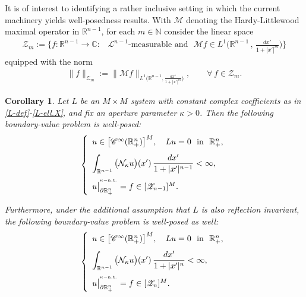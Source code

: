 \documentclass[11pt,reqno]{amsart}
\numberwithin{equation}{section}
\newtheorem{corollary}[theorem]{Corollary}
\theoremstyle{remark}
\begin{document}
It is of interest to identifying a rather inclusive setting in which the current machinery yields well-posedness results. 
With ${\mathcal{M}}$ denoting the Hardy-Littlewood maximal operator in ${\mathbb{R}}^{n-1}$, for each $m\in{\mathbb{N}}$ 
consider the linear space 
%
\begin{align}\label{76tFfaf-7GF}
{\mathscr{Z}}_m:=\Big\{f:{\mathbb{R}}^{n-1}\to{\mathbb{C}}:\,\text{ ${\mathscr{L}}^{n-1}$-measurable and }\,\,
{\mathcal{M}}f\in L^1\big({\mathbb{R}}^{n-1}\,,\,\tfrac{dx'}{1+|x'|^{m}}\big)\Big\}
\end{align}
%
equipped with the norm 
%
\begin{align}\label{76tFfaf-7GF.2}
\|f\|_{{\mathscr{Z}_m}}:=\|{\mathcal{M}}f\|_{L^1\big({\mathbb{R}}^{n-1},\frac{dx'}{1+|x'|^{m}}\big)},
\qquad\forall\,f\in{\mathscr{Z}}_m.
\end{align}

\begin{corollary}\label{Them-Gen}
Let $L$ be an $M\times M$ system with constant complex coefficients as in \eqref{L-def}-\eqref{L-ell.X}, 
and fix an aperture parameter $\kappa>0$. Then the following boundary-value problem is well-posed:
%
\begin{equation}\label{jk-lm-jhR-LLL-HM-RN.w.BVP}
\left\{
\begin{array}{l}
u\in\big[{\mathscr{C}}^{\infty}({\mathbb{R}}^n_{+})\big]^M,
\quad Lu=0\,\,\text{ in }\,\,{\mathbb{R}}^n_{+},
\\[8pt]
\displaystyle
\int_{\mathbb{R}^{n-1}}\big({\mathcal{N}}_{\kappa}u\big)(x')\,\frac{dx'}{1+|x'|^{n-1}}<\infty,
\\[12pt]
u\big|^{{}^{\kappa-{\rm n.t.}}}_{\partial{\mathbb{R}}^n_{+}}=f\in[{\mathscr{Z}}_{n-1}]^M.
\end{array}
\right.
\end{equation}

Furthermore, under the additional assumption that $L$ is also reflection invariant,
the following boundary-value problem is well-posed as well:
%
\begin{equation}\label{jk-lm-jhR-LLL-HM-RN.w.BVP.D+M}
\left\{
\begin{array}{l}
u\in\big[{\mathscr{C}}^{\infty}({\mathbb{R}}^n_{+})\big]^M,
\quad Lu=0\,\,\text{ in }\,\,{\mathbb{R}}^n_{+},
\\[8pt]
\displaystyle
\int_{\mathbb{R}^{n-1}}\big({\mathcal{N}}_{\kappa}u\big)(x')\,\frac{dx'}{1+|x'|^{n}}<\infty,
\\[12pt]
u\big|^{{}^{\kappa-{\rm n.t.}}}_{\partial{\mathbb{R}}^n_{+}}=f\in[{\mathscr{Z}}_{n}]^M.
\end{array}
\right.
\end{equation}
\end{corollary}
\end{document}
